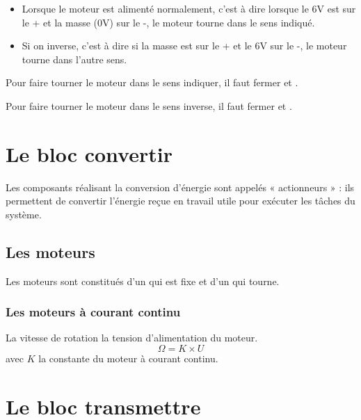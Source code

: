 \documentclass[10pt,fleqn]{article} %
\begin{document}
\begin{itemize}
  \item Lorsque le moteur est alimenté normalement, c’est à dire lorsque le 6V est sur le + et la masse (0V) sur le -, le moteur tourne dans le sens indiqué.
  \item Si on inverse, c’est à dire si la masse est sur le + et le 6V sur le -, le moteur tourne dans l’autre sens.
\end{itemize}

\begin{exemple}
  Pour faire tourner le moteur dans le sens indiquer, il faut fermer  et .
\end{exemple}

\begin{exemple}
  Pour faire tourner le moteur dans le sens inverse, il faut fermer  et .
\end{exemple}

\section{Le bloc convertir}
  \begin{definition}
    Les composants réalisant la conversion d’énergie sont appelés « actionneurs » : ils permettent de convertir l'énergie reçue en travail utile pour exécuter les tâches du système.
  \end{definition}

\subsection{Les moteurs}
\begin{aretenir}
  Les moteurs sont constitués d'un  qui est fixe et d'un  qui tourne.
\end{aretenir}

\subsubsection{Les moteurs à courant continu}
\begin{aretenir}
  La vitesse de rotation  la tension d'alimentation du moteur.
  $$\Omega = K\times U$$
  avec $K$ la constante du moteur à courant continu.
\end{aretenir}

\section{Le bloc transmettre}
\end{document}
